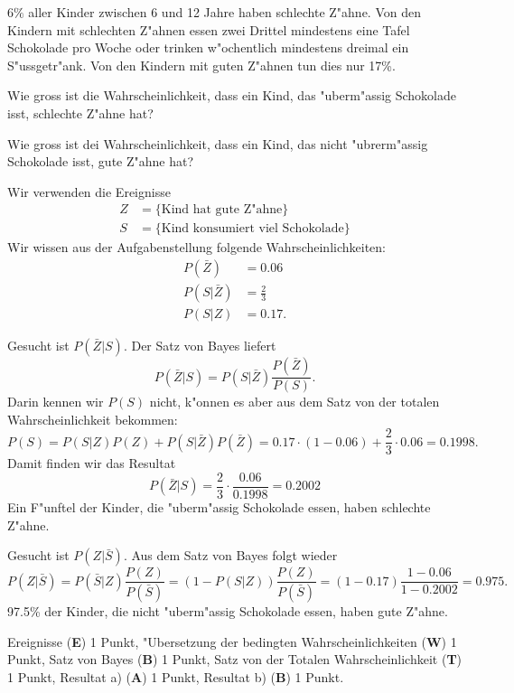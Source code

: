 $6\%$ aller Kinder zwischen 6 und 12 Jahre haben schlechte Z"ahne.
Von den Kindern mit schlechten Z"ahnen essen zwei Drittel mindestens eine
Tafel Schokolade pro Woche oder trinken w"ochentlich mindestens
dreimal ein S"ussgetr"ank. Von den Kindern mit guten Z"ahnen tun dies
nur 17\%.
\begin{teilaufgaben}
\item Wie gross ist die Wahrscheinlichkeit, dass ein Kind, das "uberm"assig
Schokolade isst, schlechte Z"ahne hat?
\item Wie gross ist dei Wahrscheinlichkeit, dass ein Kind, das nicht
"ubrerm"assig Schokolade isst, gute Z"ahne hat?
\end{teilaufgaben}

\begin{loesung}
Wir verwenden die Ereignisse
\begin{align*}
Z&=\{\text{Kind hat gute Z"ahne}\}
\\
S&=\{\text{Kind konsumiert viel Schokolade}\}
\end{align*}
Wir wissen aus der Aufgabenstellung folgende Wahrscheinlichkeiten:
\begin{align*}
P(\bar Z)&=0.06\\
P(S|\bar Z)&=\frac23\\
P(S|Z)&=0.17.
\end{align*}
\begin{teilaufgaben}
\item Gesucht ist $P(\bar Z|S)$. Der Satz von Bayes liefert
\[
P(\bar Z|S)= P(S|\bar Z) \frac{P(\bar Z)}{P(S)}.
\]
Darin kennen wir $P(S)$ nicht, k"onnen es aber aus dem Satz von der
totalen Wahrscheinlichkeit bekommen:
\[
P(S)=P(S|Z)P(Z)+P(S|\bar Z)P(\bar Z)
=0.17\cdot (1-0.06)+\frac23\cdot 0.06=0.1998.
\]
Damit finden wir das Resultat
\[
P(\bar Z|S)=\frac23\cdot \frac{0.06}{0.1998}=0.2002
\]
Ein F"unftel der Kinder, die "uberm"assig Schokolade essen, haben
schlechte Z"ahne.
\item Gesucht ist $P(Z|\bar S)$. Aus dem Satz von Bayes folgt wieder
\[
P(Z|\bar S)=P(\bar S|Z)\frac{P(Z)}{P(\bar S)}=(1-P(S|Z))\frac{P(Z)}{P(\bar S)}
=(1-0.17)\frac{1-0.06}{1-0.2002}=0.975.
\]
97.5\% der Kinder, die nicht "uberm"assig Schokolade essen, haben gute 
Z"ahne.
\end{teilaufgaben}
\end{loesung}

\begin{bewertung}
Ereignisse ({\bf E}) 1 Punkt,
"Ubersetzung der bedingten Wahrscheinlichkeiten ({\bf W}) 1 Punkt,
Satz von Bayes ({\bf B}) 1 Punkt,
Satz von der Totalen Wahrscheinlichkeit ({\bf T}) 1 Punkt,
Resultat a) ({\bf A}) 1 Punkt,
Resultat b) ({\bf B}) 1 Punkt.
\end{bewertung}



